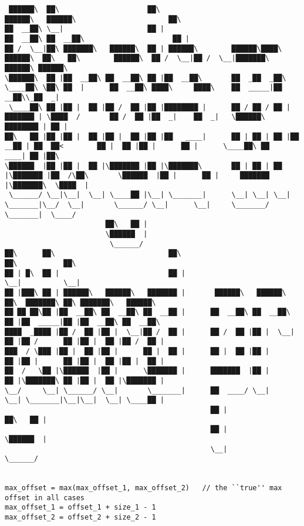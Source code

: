 \documentclass[varwidth=\maxdimen,margin=0.5cm,multi={verbatim}]{standalone}
\begin{document}
\begin{verbatim}
 ██████\  ██\                     ██\                                                                    ██████\   ██████\                      ██\
██  __██\ \__|                    ██ |                                                                  ██  __██\ ██  __██\                     ██ |
██ /  \__|██\ ███████\   ██████\  ██ | ██████\        ██████\████\   ██████\  ██\   ██\        ██████\  ██ /  \__|██ /  \__|███████\  ██████\ ██████\
\██████\  ██ |██  __██\ ██  __██\ ██ |██  __██\       ██  _██  _██\  \____██\ \██\ ██  |      ██  __██\ ████\     ████\    ██  _____|██  __██\\_██  _|
 \____██\ ██ |██ |  ██ |██ /  ██ |██ |████████ |      ██ / ██ / ██ | ███████ | \████  /       ██ /  ██ |██  _|    ██  _|   \██████\  ████████ | ██ |
██\   ██ |██ |██ |  ██ |██ |  ██ |██ |██   ____|      ██ | ██ | ██ |██  __██ | ██  ██<        ██ |  ██ |██ |      ██ |      \____██\ ██   ____| ██ |██\
\██████  |██ |██ |  ██ |\███████ |██ |\███████\       ██ | ██ | ██ |\███████ |██  /\██\       \██████  |██ |      ██ |     ███████  |\███████\  \████  |
 \______/ \__|\__|  \__| \____██ |\__| \_______|      \__| \__| \__| \_______|\__/  \__|       \______/ \__|      \__|     \_______/  \_______|  \____/
                        ██\   ██ |
                        \██████  |
                         \______/
██\      ██\                           ██\                           ██\           ██\
██ | █\  ██ |                          ██ |                          \__|          \__|
██ |███\ ██ | ██████\   ██████\   ███████ |       ██████\   ██████\  ██\  ███████\ ██\ ███████\   ██████\
██ ██ ██\██ |██  __██\ ██  __██\ ██  __██ |      ██  __██\ ██  __██\ ██ |██  _____|██ |██  __██\ ██  __██\
████  _████ |██ /  ██ |██ |  \__|██ /  ██ |      ██ /  ██ |██ |  \__|██ |██ /      ██ |██ |  ██ |██ /  ██ |
███  / \███ |██ |  ██ |██ |      ██ |  ██ |      ██ |  ██ |██ |      ██ |██ |      ██ |██ |  ██ |██ |  ██ |
██  /   \██ |\██████  |██ |      \███████ |      ███████  |██ |      ██ |\███████\ ██ |██ |  ██ |\███████ |
\__/     \__| \______/ \__|       \_______|      ██  ____/ \__|      \__| \_______|\__|\__|  \__| \____██ |
                                                 ██ |                                            ██\   ██ |
                                                 ██ |                                            \██████  |
                                                 \__|                                             \______/


max_offset = max(max_offset_1, max_offset_2)   // the ``true'' max offset in all cases
max_offset_1 = offset_1 + size_1 - 1
max_offset_2 = offset_2 + size_2 - 1


\end{verbatim}
\end{document}
